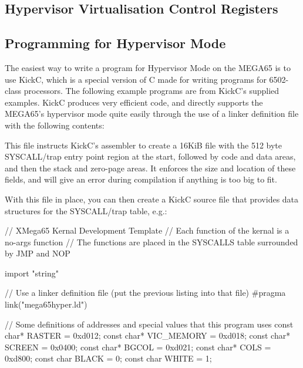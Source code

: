 \begin{enmerate}
\subsection{Hypervisor Virtualisation Control Registers}



\subsection{Programming for Hypervisor Mode}

The easiest way to write a program for Hypervisor Mode on the MEGA65 is to use KickC, which is a special version of C
made for writing programs for 6502-class processors.  The following example programs are from KickC's supplied examples.
KickC produces very efficient code, and directly supports the MEGA65's
hypervisor mode quite easily through the use of a linker definition file with the following contents:


This file instructs KickC's assembler to create a 16KiB file with the 512 byte SYSCALL/trap entry point region at the start,
followed by code and data areas, and then the stack and zero-page areas. It enforces the size and location of these fields, and
will give an error during compilation if anything is too big to fit.

With this file in place, you can then create a KickC source file that provides data structures for the SYSCALL/trap table, e.g.:

\begin{screenoutput}
// XMega65 Kernal Development Template
// Each function of the kernal is a no-args function
// The functions are placed in the SYSCALLS table surrounded by JMP and NOP

import "string"

// Use a linker definition file (put the previous listing into that file)
#pragma link("mega65hyper.ld")

// Some definitions of addresses and special values that this program uses
const char* RASTER = 0xd012;
const char* VIC_MEMORY = 0xd018;
const char* SCREEN = 0x0400;
const char* BGCOL = 0xd021;
const char* COLS = 0xd800;
const char BLACK = 0;
const char WHITE = 1;


\end{screenoutput}
\end{enmerate}

